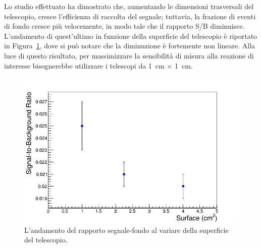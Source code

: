 Lo studio effettuato ha dimostrato che, aumentando le dimensioni trasversali del telescopio, cresce l'efficienza di raccolta del segnale; tuttavia, la frazione di eventi di fondo cresce più velocemente, in modo tale che il rapporto S/B diminuisce.
L'andamento di quest'ultimo in funzione della superficie del telescopio è riportato in Figura~\ref{fig:rapporto_segnale_fondo}, dove si può notare che la diminuzione è fortemente non lineare.
Alla luce di questo risultato, per massimizzare la sensibilità di misura alla reazione di interesse bisognerebbe utilizzare i telescopi da 1~cm $\times$ 1~cm.

\begin{figure} [!t]
	\centering
	\includegraphics[scale=0.5]{Grafici_Tesi2/Granularita/sig_back_ratio.png}
	\caption{L'andamento del rapporto segnale-fondo al variare della superficie del telescopio.} \label{fig:rapporto_segnale_fondo}
\end{figure}

